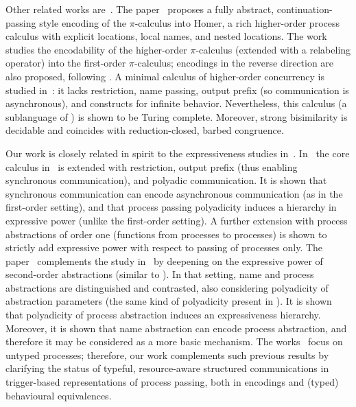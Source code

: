 Other related works are~\cite{BundgaardHG06,XuActa2012,DBLP:journals/iandc/LanesePSS11}.
The paper~\cite{BundgaardHG06} proposes a fully abstract, continuation-passing style encoding of the 
$\pi$-calculus into Homer, a rich higher-order process calculus with explicit locations, local names, and nested locations.
The work~\cite{XuActa2012} studies the encodability of the higher-order $\pi$-calculus (extended with a relabeling operator) into the first-order $\pi$-calculus; encodings in the reverse direction are also proposed, following \cite{Tho90}.
A minimal calculus of higher-order concurrency is studied in~\cite{DBLP:journals/iandc/LanesePSS11}: it lacks restriction,  name passing, output prefix (so  communication is asynchronous), and constructs for infinite behavior. 
Nevertheless, this calculus (a sublanguage of \HO) is shown to be Turing complete. Moreover, 
strong bisimilarity is decidable and coincides with reduction-closed, barbed congruence. 


Our work is closely related in spirit to the expressiveness studies in~\cite{DBLP:conf/icalp/LanesePSS10,DBLP:conf/wsfm/XuYL13}.
In~\cite{DBLP:conf/icalp/LanesePSS10}
the core calculus in~\cite{DBLP:journals/iandc/LanesePSS11} is extended with restriction, output prefix (thus enabling synchronous communication), 
and polyadic communication. It is shown that 
synchronous communication can encode asynchronous communication (as in the first-order setting),
and that process passing polyadicity induces a hierarchy in expressive power (unlike the first-order setting).
A further extension with process abstractions of order one
(functions from processes to processes)
 is shown to strictly add expressive power with respect to passing of processes only.
The paper~\cite{DBLP:conf/wsfm/XuYL13} complements the study in~\cite{DBLP:conf/icalp/LanesePSS10} by deepening on the expressive power of second-order abstractions (similar to \HO). 
In that setting, name and process abstractions are distinguished and contrasted, also considering polyadicity of abstraction parameters (the same kind of polyadicity present in \pHOp). It is shown that polyadicity of process abstraction induces an expressiveness hierarchy. Moreover, it is shown that name abstraction can encode process abstraction, and therefore it may be considered as a more basic mechanism. 
The works~\cite{DBLP:conf/icalp/LanesePSS10,DBLP:conf/wsfm/XuYL13} focus on untyped processes;
therefore, our work complements such previous results by clarifying the status of typeful, resource-aware structured communications in
trigger-based representations of process passing, both in encodings and (typed) behavioural equivalences.

